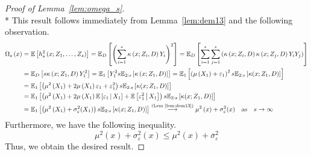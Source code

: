 \begin{proof}[Proof of Lemma~\ref{lem:omega_s}]\mbox{}\\*
    This result follows immediately from Lemma~\ref{lem:dem13} and the following observation.
	\begin{equation}
		\begin{aligned}
			\Omega_{s}\left(x\right)
			 & = \mathbb{E}\left[h_{s}^{2}\left(x; Z_1, \ldots,  Z_{s}\right)\right]
			= \mathbb{E}_{D}\left[\left(\sum_{i = 1}^{s}\kappa\left(x; Z_{i}, D\right)Y_{i}\right)^2\right]
			= \mathbb{E}_{D}\left[\sum_{i = 1}^{s}\sum_{j = 1}^{s}\left(\kappa\left(x; Z_{i}, D\right)\kappa\left(x; Z_{j}, D\right)Y_{i}Y_{j}\right)\right] \\
			 & = \mathbb{E}_{D}\left[s \kappa\left(x; Z_{1}, D\right)Y_{1}^2\right]
			= \mathbb{E}_{1}\left[Y_{1}^2 s \mathbb{E}_{2:s}\left[\kappa\left(x; Z_{1}, D\right)\right]\right]       
            = \mathbb{E}_{1}\left[\left(\mu\left(X_1\right) + \varepsilon_1\right)^2 s \mathbb{E}_{2:s}\left[\kappa(x; Z_1, D)\right]\right] \\
			 & = \mathbb{E}_{1}\left[\left(\mu^2\left(X_1\right) + 2\mu\left(X_1\right)\varepsilon_1 + \varepsilon_1^2\right)s \mathbb{E}_{2:s}\left[\kappa(x; Z_1, D)\right]\right]                       \\
			 & = \mathbb{E}_{1}\left[\left(\mu^2\left(X_1\right) + 2\mu\left(X_1\right) \mathbb{E}\left[\varepsilon_1 \, \middle| \, X_1\right] + \mathbb{E}\left[\varepsilon_1^2 \, \middle| \, X_1\right]\right)
			s \mathbb{E}_{2:s}\left[\kappa(x; Z_1, D)\right]\right]                                                                                                                                \\
			 & = \mathbb{E}_{1}\left[\left(\mu^2\left(X_1\right) +\sigma_{\varepsilon}^{2}(X_1)\right) s \mathbb{E}_{2:s}\left[\kappa(x; Z_1, D)\right]\right]              \overset{\text{(Lem~\ref{lem:dem13})}}{\longrightarrow} \mu^2\left(x\right) +\sigma_{\varepsilon}^{2}(x)
			\quad \text{as} \quad s \rightarrow \infty
		\end{aligned}
	\end{equation}
    Furthermore, we have the following inequality.
    \begin{equation}
        \mu^2(x) + \sigma_{\varepsilon}^2(x) \leq \mu^2\left(x\right) + \overline{\sigma}_{\varepsilon}^{2}
    \end{equation}
	Thus, we obtain the desired result.
\end{proof}

